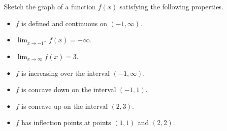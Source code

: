 \documentclass[../main.tex]{subfiles}
\begin{document}
  \begin{example}
    Sketch the graph of a function \(f(x)\) satisfying the following properties.
    \begin{itemize}
      \item \(f\) is defined and continuous on \((-1, \infty)\).
      \item \(\lim_{x \to -1^{+}} f(x) = -\infty\).
      \item \(\lim_{x \to \infty} f(x) = 3\).
      \item \(f\) is increasing over the interval \((-1,\infty)\).
      \item \(f\) is concave down on the interval \((-1,1)\).
      \item \(f\) is concave up on the interval \((2, 3)\).
      \item \(f\) has inflection points at points \((1,1)\) and \((2,2)\).
    \end{itemize}

  \end{example}
\end{document}

